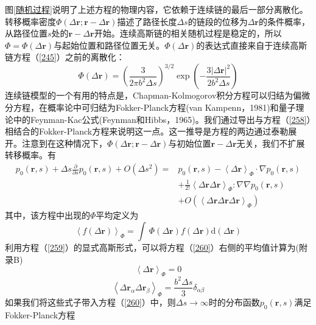 图\ref{随机过程}说明了上述方程的物理内容，它依赖于连续链的最后一部分离散化。转移概率密度$\Phi(\Delta \mathbf{r};\mathbf{r}-\Delta \mathbf{r})$描述了路径长度$\Delta s$的链段的位移为$\Delta \mathbf{r}$的条件概率，从路径位置$s$处的$\mathbf{r}-\Delta \mathbf{r}$开始。连续高斯链的相关随机过程是稳定的，所以$\Phi =\Phi(\Delta \mathbf{r})$与起始位置和路径位置无关。$\Phi(\Delta \mathbf{r})$的表达式直接来自于连续高斯链方程（\ref{245}）之前的离散化：
\begin{equation}\label{259}
\Phi(\Delta \mathbf{r})=\left( \frac{3}{2\pi b^2 \Delta s} \right)^{3/2}\exp \left(- \frac{3\left| \Delta \mathbf{r} \right|^2}{2b^2 \Delta s} \right) 
\end{equation}
连续链模型的一个有用的特点是，Chapman-Kolmogorov积分方程可以归结为偏微分方程，在概率论中可归结为Fokker-Planck方程(van Kampenn，1981)和量子理论中的Feynman-Kac公式(Feynman和Hibbs，1965)。我们通过导出与方程（\ref{258}）相结合的Fokker-Planck方程来说明这一点。这一推导是方程的两边通过泰勒展开。注意到在这种情况下，$\Phi(\Delta \mathbf{r};\mathbf{r}-\Delta \mathbf{r})$与初始位置$\mathbf{r}-\Delta \mathbf{r}$无关，我们不扩展转移概率。有
\begin{equation}\label{260}
\begin{aligned}
p_0(\mathbf{r},s)+\Delta s\frac{\partial}{\partial s}p_0(\mathbf{r},s)+O(\Delta s^2)=&p_0(\mathbf{r},s)-\left \langle \Delta \mathbf{r} \right \rangle _\Phi \cdot \nabla p_0 (\mathbf{r},s)\\ &+\frac{1}{2!}\left \langle \Delta \mathbf{r}  \Delta \mathbf{r} \right \rangle _\Phi:\nabla \nabla p_0(\mathbf{r},s)\\ &+O(\left \langle \Delta \mathbf{r}  \Delta \mathbf{r}  \Delta \mathbf{r} \right \rangle _\Phi)
\end{aligned}
\end{equation}
其中，该方程中出现的$\Phi$平均定义为
\begin{equation}\label{261}
\left \langle f(\Delta \mathbf{r}) \right \rangle _\Phi = \int \,\Phi (\Delta \mathbf{r})f(\Delta \mathbf{r}) \mathrm{d}(\Delta \mathbf{r})
\end{equation}
利用方程（\ref{259}）的显式高斯形式，可以将方程（\ref{260}）右侧的平均值计算为(附录B)
\begin{equation}\label{262}
\left \langle \Delta \mathbf{r} \right \rangle _\Phi = 0
\end{equation}
\begin{equation}\label{263}
\left \langle \Delta \mathbf{r}_\alpha \Delta \mathbf{r}_\beta \right \rangle _\Phi = \frac{b^2 \Delta s}{3}\delta_{\alpha \beta}
\end{equation}
如果我们将这些式子带入方程（\ref{260}）中，则$\Delta s \rightarrow \infty$时的分布函数$p_0(\mathbf{r},s)$满足Fokker-Planck方程

